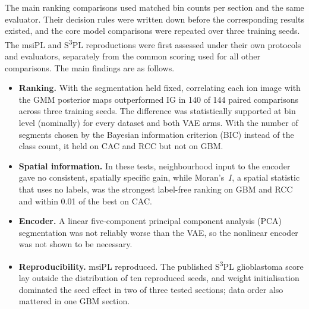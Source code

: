 The main ranking comparisons used matched bin counts per section and the same
evaluator. Their decision rules were written down before the
corresponding results existed, and the core model comparisons were repeated
over three training seeds. The msiPL and S\textsuperscript{3}PL reproductions were
first assessed under their own protocols and evaluators, separately from the
common scoring used for all other comparisons.
The main findings are as follows.
\begin{itemize}
  \item \textbf{Ranking.} With the segmentation held fixed, correlating each
        ion image with the GMM posterior maps outperformed IG in 140 of 144
        paired comparisons across three training seeds. The difference was
        statistically supported at bin level (nominally) for every dataset and
        both VAE arms. With the
        number of segments chosen by the Bayesian information criterion (BIC) instead of the class count, it held
        on CAC and RCC but not on GBM.
  \item \textbf{Spatial information.} In these tests, neighbourhood input to
        the encoder gave no consistent, spatially specific gain, while
        Moran's~$I$, a spatial statistic that uses no labels, was the strongest
        label-free ranking on GBM and RCC and within 0.01 of the best on CAC.
  \item \textbf{Encoder.} A linear five-component principal component analysis (PCA)
        segmentation was not reliably worse than the VAE, so the nonlinear encoder
        was not shown to be necessary.
  \item \textbf{Reproducibility.} msiPL reproduced. The published S\textsuperscript{3}PL
        glioblastoma score lay outside the distribution of ten reproduced
        seeds, and weight initialisation dominated the seed effect in two of
        three tested sections; data order also mattered in one GBM section.
\end{itemize}

